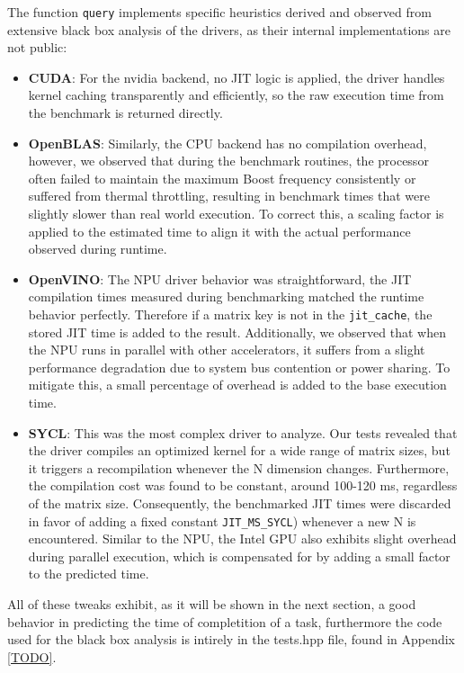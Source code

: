 The function \texttt{query} implements specific heuristics derived and observed from extensive black box analysis of the drivers, as their internal implementations are not public:

\begin{itemize}
    \item \textbf{CUDA}: For the nvidia backend, no JIT logic is applied, the driver handles kernel caching transparently and efficiently, so the raw execution time from the benchmark is returned directly.

    \item \textbf{OpenBLAS}: Similarly, the CPU backend has no compilation overhead, however, we observed that during the benchmark routines, the processor often failed to maintain the maximum Boost frequency consistently or suffered from thermal throttling, resulting in benchmark times that were slightly slower than real world execution. To correct this, a scaling factor is applied to the estimated time to align it with the actual performance observed during runtime.

    \item \textbf{OpenVINO}: The NPU driver behavior was straightforward, the JIT compilation times measured during benchmarking matched the runtime behavior perfectly. Therefore if a matrix key is not in the \texttt{jit\_cache}, the stored JIT time is added to the result. Additionally, we observed that when the NPU runs in parallel with other accelerators, it suffers from a slight performance degradation due to system bus contention or power sharing. To mitigate this, a small percentage of overhead is added to the base execution time.

    \item \textbf{SYCL}: This was the most complex driver to analyze. Our tests revealed that the driver compiles an optimized kernel for a wide range of matrix sizes, but it triggers a recompilation whenever the N dimension changes. Furthermore, the compilation cost was found to be constant, around 100-120 ms, regardless of the matrix size. Consequently, the benchmarked JIT times were discarded in favor of adding a fixed constant \texttt{JIT\_MS\_SYCL}) whenever a new N is encountered. Similar to the NPU, the Intel GPU also exhibits slight overhead during parallel execution, which is compensated for by adding a small factor to the predicted time.
\end{itemize}

All of these tweaks exhibit, as it will be shown in the next section, a good behavior in predicting the time of completition of a task, furthermore the code used for the black box analysis is intirely in the tests.hpp file, found in Appendix \ref{TODO}.

